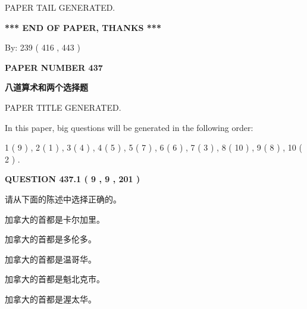 \documentclass{ctexart}
\begin{document}
   
   
\vspace{2.0in} PAPER TAIL GENERATED.
   
   
   
   
\vspace{1.0in} 
{\textbf{\large{ *** END OF PAPER, THANKS *** }}} 
   
   
\hspace{1.0in} By: 
 239 ( 416 ,  443 )
   
   
   
   
\newpage 
\setcounter{page}{ 
   437001 } 
   
   
   
   
 {\textbf{ \Large{ PAPER NUMBER  437  }}}
   
   
\vspace{0.2in}
   
   
   
   
   
   
   
   
 \vspace{0.2in}
{\LARGE {\textbf{ 八道算术和两个选择题}}}
   
   
 PAPER TITLE GENERATED.
   
   
   
\vspace{0.2in}
   
In this paper, big questions will be generated in the following order: 
   
   
   1 ( 9 )
 ,
   2 ( 1 )
 ,
   3 ( 4 )
 ,
   4 ( 5 )
 ,
   5 ( 7 )
 ,
   6 ( 6 )
 ,
   7 ( 3 )
 ,
   8 ( 10 )
 ,
   9 ( 8 )
 ,
   10 ( 2 )
 .
  
\vspace{0.2in}
  
{\textbf{\Large{QUESTION
437.1 
 ( 9 , 9 , 201 )
}}}
  
  
请从下面的陈述中选择正确的。
 
 
加拿大的首都是卡尔加里。
 
 
加拿大的首都是多伦多。
 
 
加拿大的首都是温哥华。
 
 
加拿大的首都是魁北克市。
 
 
加拿大的首都是渥太华。
 
\end{document}
